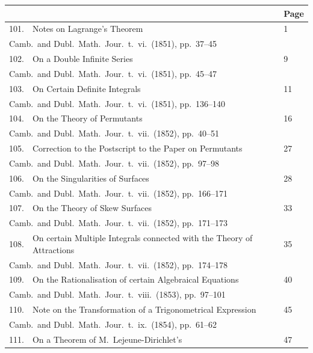 \documentclass[11pt,a4paper]{book}
\begin{document}
\begin{longtable}{rp{8cm}l}
\toprule
\multicolumn{1}{c}{} & \multicolumn{1}{c}{} & \multicolumn{1}{c}{Page}\\
\midrule
\endhead
101. & Notes on Lagrange's Theorem & 1\\
\multicolumn{3}{l}{\small Camb.\ and Dubl.\ Math.\ Jour.\ t.\ vi.\ (1851), pp.\ 37--45}\\[0.5em]
102. & On a Double Infinite Series & 9\\
\multicolumn{3}{l}{\small Camb.\ and Dubl.\ Math.\ Jour.\ t.\ vi.\ (1851), pp.\ 45--47}\\[0.5em]
103. & On Certain Definite Integrals & 11\\
\multicolumn{3}{l}{\small Camb.\ and Dubl.\ Math.\ Jour.\ t.\ vi.\ (1851), pp.\ 136--140}\\[0.5em]
104. & On the Theory of Permutants & 16\\
\multicolumn{3}{l}{\small Camb.\ and Dubl.\ Math.\ Jour.\ t.\ vii.\ (1852), pp.\ 40--51}\\[0.5em]
105. & Correction to the Postscript to the Paper on Permutants & 27\\
\multicolumn{3}{l}{\small Camb.\ and Dubl.\ Math.\ Jour.\ t.\ vii.\ (1852), pp.\ 97--98}\\[0.5em]
106. & On the Singularities of Surfaces & 28\\
\multicolumn{3}{l}{\small Camb.\ and Dubl.\ Math.\ Jour.\ t.\ vii.\ (1852), pp.\ 166--171}\\[0.5em]
107. & On the Theory of Skew Surfaces & 33\\
\multicolumn{3}{l}{\small Camb.\ and Dubl.\ Math.\ Jour.\ t.\ vii.\ (1852), pp.\ 171--173}\\[0.5em]
108. & On certain Multiple Integrals connected with the Theory of Attractions & 35\\
\multicolumn{3}{l}{\small Camb.\ and Dubl.\ Math.\ Jour.\ t.\ vii.\ (1852), pp.\ 174--178}\\[0.5em]
109. & On the Rationalisation of certain Algebraical Equations & 40\\
\multicolumn{3}{l}{\small Camb.\ and Dubl.\ Math.\ Jour.\ t.\ viii.\ (1853), pp.\ 97--101}\\[0.5em]
110. & Note on the Transformation of a Trigonometrical Expression & 45\\
\multicolumn{3}{l}{\small Camb.\ and Dubl.\ Math.\ Jour.\ t.\ ix.\ (1854), pp.\ 61--62}\\[0.5em]
111. & On a Theorem of M.\ Lejeune-Dirichlet's & 47\\

\end{longtable}
\end{document}
